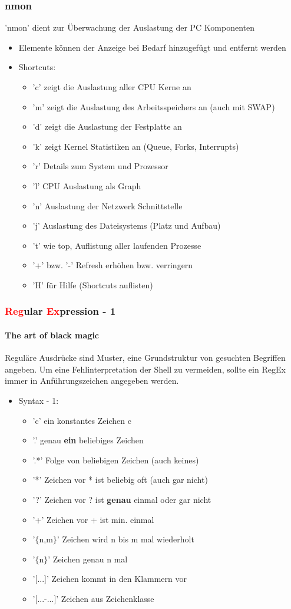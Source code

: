\documentclass[12pt,utf8]{beamer}
\begin{document}
\begin{frame}
\frametitle{nmon}
'nmon' dient zur Überwachung der Auslastung der PC Komponenten
\begin{itemize}
	\item Elemente können der Anzeige bei Bedarf hinzugefügt und entfernt werden
	\item Shortcuts:
	\begin{itemize}[<+->]
		\item 'c' zeigt die Auslastung aller CPU Kerne an
		\item 'm' zeigt die Auslastung des Arbeitsspeichers an (auch mit SWAP)
		\item 'd' zeigt die Auslastung der Festplatte an
		\item 'k' zeigt Kernel Statistiken an (Queue, Forks, Interrupts)
		\item 'r' Details zum System und Prozessor
		\item 'l' CPU Auslastung als Graph
		\item 'n' Auslastung der Netzwerk Schnittstelle
		\item 'j' Auslastung des Dateisystems (Platz und Aufbau)
		\item 't' wie top, Auflistung aller laufenden Prozesse
		\item '+' bzw. '-' Refresh erhöhen bzw. verringern
		\item 'H' für Hilfe (Shortcuts auflisten)
	\end{itemize}
\end{itemize}
\end{frame}

\begin{frame}
\frametitle{\textcolor{red}{Reg}ular \textcolor{red}{Ex}pression - 1}
\framesubtitle{The art of black magic}
Reguläre Ausdrücke sind Muster, eine Grundstruktur von gesuchten Begriffen angeben. Um eine Fehlinterpretation der Shell zu vermeiden, sollte ein RegEx immer in Anführungszeichen angegeben werden.
\begin{itemize}
	\item Syntax - 1:
	\begin{itemize}[<+->]
		\item 'c' ein konstantes Zeichen c
		\item '.' genau \textbf{ein} beliebiges Zeichen
		\item '.*' Folge von beliebigen Zeichen (auch keines)
		\item '*' Zeichen vor * ist beliebig oft (auch gar nicht)
		\item '?' Zeichen vor ? ist \textbf{genau} einmal oder gar nicht
		\item '+' Zeichen vor + ist min. einmal
		\item '$\{$n,m$\}$' Zeichen wird n bis m mal wiederholt
		\item '$\{$n$\}$' Zeichen genau n mal
		\item '[...]' Zeichen kommt in den Klammern vor
		\item '[...-...]' Zeichen aus Zeichenklasse
		
	\end{itemize}
\end{itemize}
\end{frame}
\end{document}
